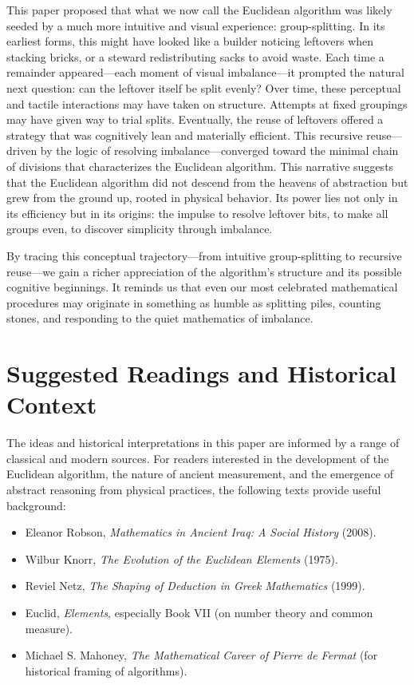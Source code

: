 \documentclass{article}
\begin{document}
This paper proposed that what we now call the Euclidean algorithm was likely seeded by a much more intuitive and visual experience: group-splitting. In its earliest forms, this might have looked like a builder noticing leftovers when stacking bricks, or a steward redistributing sacks to avoid waste. Each time a remainder appeared—each moment of visual imbalance—it prompted the natural next question: can the leftover itself be split evenly? Over time, these perceptual and tactile interactions may have taken on structure. Attempts at fixed groupings may have given way to trial splits. Eventually, the reuse of leftovers offered a strategy that was cognitively lean and materially efficient. This recursive reuse—driven by the logic of resolving imbalance—converged toward the minimal chain of divisions that characterizes the Euclidean algorithm. This narrative suggests that the Euclidean algorithm did not descend from the heavens of abstraction but grew from the ground up, rooted in physical behavior. Its power lies not only in its efficiency but in its origins: the impulse to resolve leftover bits, to make all groups even, to discover simplicity through imbalance.

By tracing this conceptual trajectory—from intuitive group-splitting to recursive reuse—we gain a richer appreciation of the algorithm’s structure and its possible cognitive beginnings. It reminds us that even our most celebrated mathematical procedures may originate in something as humble as splitting piles, counting stones, and responding to the quiet mathematics of imbalance.


\section{Suggested Readings and Historical Context}

The ideas and historical interpretations in this paper are informed by a range of classical and modern sources. For readers interested in the development of the Euclidean algorithm, the nature of ancient measurement, and the emergence of abstract reasoning from physical practices, the following texts provide useful background:

\begin{itemize}
    \item Eleanor Robson, \textit{Mathematics in Ancient Iraq: A Social History} (2008).
    \item Wilbur Knorr, \textit{The Evolution of the Euclidean Elements} (1975).
    \item Reviel Netz, \textit{The Shaping of Deduction in Greek Mathematics} (1999).
    \item Euclid, \textit{Elements}, especially Book VII (on number theory and common measure).
    \item Michael S. Mahoney, \textit{The Mathematical Career of Pierre de Fermat} (for historical framing of algorithms).
\end{itemize}
\end{document}
